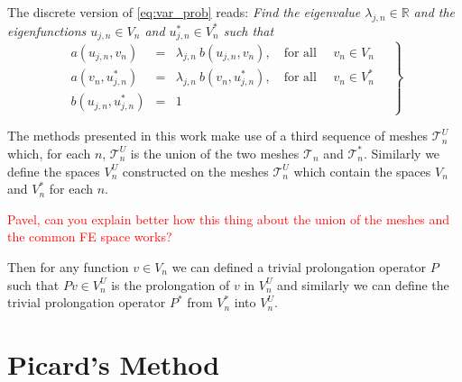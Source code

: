 \documentclass[preprint,12pt]{elsarticle}
\begin{document}
The discrete version of \eqref{eq:var_prob} reads:
\emph{Find the eigenvalue $\lambda_{j,n}\in \mathbb{R}$ and the eigenfunctions $u_{j,n}\in V_n$ and $u_{j,n}^*\in V_n^*$
such that}
\begin{equation}
\label{eq:disc_prob}
\left.
\begin{array}{lcl}
a(u_{j,n},v_{n})&=& \lambda_{j,n}\ b(u_{j,n},v_{n}),
\quad \text{for all } \quad v_{n}  \in V_n\\
a(v_{n},u_{j,n}^*)&=& \lambda_{j,n}\ b(v_{n},u_{j,n}^*),
\quad \text{for all } \quad v_{n}  \in V_n^*\\
 b(u_{j,n},u_{j,n}^*) &=& 1
\end{array}\quad
\right\}
\end{equation}

The methods presented in this work make use of a third sequence of meshes $\mathcal{T}_n^U$ which, for each $n$, $\mathcal{T}_n^U$ is the union of the two meshes  $\mathcal{T}_n$ and $\mathcal{T}_n^*$. Similarly we define the spaces $V_n^U$ constructed on the meshes $\mathcal{T}_n^U$ which contain the spaces $V_n$ and $V_n^*$ for each $n$. 

\textcolor{red}{Pavel, can you explain better how this thing about the union of the meshes and the common FE space works?}

Then for any function $v\in V_n$ we can defined a trivial prolongation operator $P$ such that $Pv\in V_n^U$ is the prolongation of $v$ in $V_n^U$ and similarly we can define the trivial prolongation operator $P^*$ from $V_n^*$ into $V_n^U$. %


\section{Picard's Method}\label{sec:picard}
\end{document}

